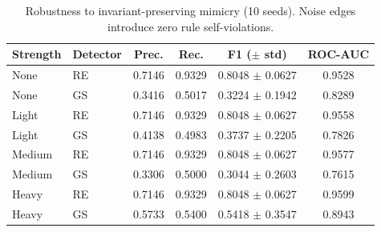 \begin{table}[t]
\centering
\small
\caption{Robustness to invariant-preserving mimicry (10 seeds). Noise edges introduce zero rule self-violations.}
\label{tab:mimicry}
\begin{tabular}{llcccc}
\toprule
Strength & Detector & Prec. & Rec. & F1 ($\pm$ std) & ROC-AUC \\
\midrule
None & RE & 0.7146 & 0.9329 & 0.8048 $\pm$ 0.0627 & 0.9528 \\
None & GS & 0.3416 & 0.5017 & 0.3224 $\pm$ 0.1942 & 0.8289 \\
Light & RE & 0.7146 & 0.9329 & 0.8048 $\pm$ 0.0627 & 0.9558 \\
Light & GS & 0.4138 & 0.4983 & 0.3737 $\pm$ 0.2205 & 0.7826 \\
Medium & RE & 0.7146 & 0.9329 & 0.8048 $\pm$ 0.0627 & 0.9577 \\
Medium & GS & 0.3306 & 0.5000 & 0.3044 $\pm$ 0.2603 & 0.7615 \\
Heavy & RE & 0.7146 & 0.9329 & 0.8048 $\pm$ 0.0627 & 0.9599 \\
Heavy & GS & 0.5733 & 0.5400 & 0.5418 $\pm$ 0.3547 & 0.8943 \\
\bottomrule
\end{tabular}
\end{table}
